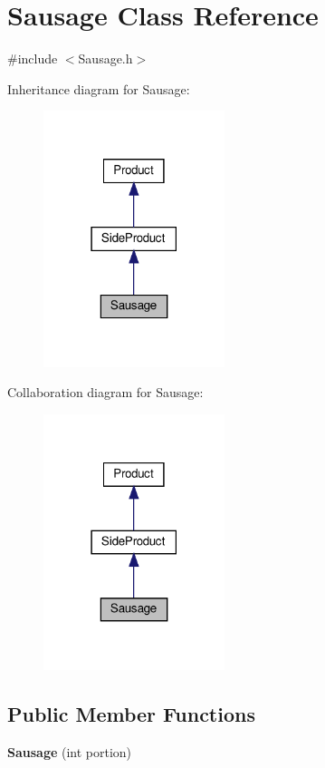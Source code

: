 \hypertarget{classSausage}{}\section{Sausage Class Reference}
\label{classSausage}


{\ttfamily \#include $<$Sausage.\+h$>$}



Inheritance diagram for Sausage\+:
\nopagebreak
\begin{figure}[H]
\begin{center}
\leavevmode
\includegraphics[width=150pt]{classSausage__inherit__graph}
\end{center}
\end{figure}


Collaboration diagram for Sausage\+:
\nopagebreak
\begin{figure}[H]
\begin{center}
\leavevmode
\includegraphics[width=150pt]{classSausage__coll__graph}
\end{center}
\end{figure}
\subsection*{Public Member Functions}
\begin{DoxyCompactItemize}
\item 
\mbox{\label{classSausage_a04febb9bb976bb9054aac77465b5186b}} 
{\bfseries Sausage} (int portion)
\end{DoxyCompactItemize}
